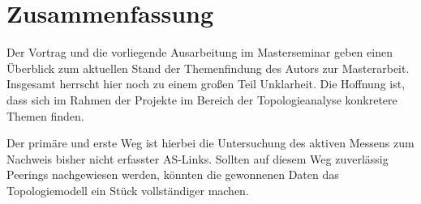 \section{Zusammenfassung}\label{sec:schluss}
Der Vortrag und die vorliegende Ausarbeitung im Masterseminar geben einen Überblick zum aktuellen Stand der Themenfindung des Autors zur Masterarbeit.
Insgesamt herrscht hier noch zu einem großen Teil Unklarheit.
Die Hoffnung ist, dass sich im Rahmen der Projekte im Bereich der Topologieanalyse konkretere Themen finden.

Der primäre und erste Weg ist hierbei die Untersuchung des aktiven Messens zum Nachweis bisher nicht erfasster AS-Links.
Sollten auf diesem Weg zuverlässig Peerings nachgewiesen werden, könnten die gewonnenen Daten das Topologiemodell ein Stück vollständiger machen.

